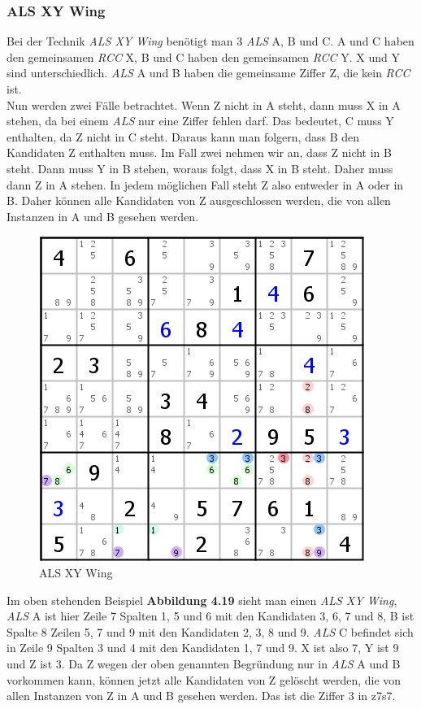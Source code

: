 \newpage
\subsubsection{ALS XY Wing}
Bei der Technik \textit{ALS XY Wing} benötigt man 3 \textit{ALS} A, B und C. A und C haben den gemeinsamen \textit{RCC} X, B und C haben den gemeinsamen \textit{RCC} Y. X und Y sind unterschiedlich. \textit{ALS} A und B haben die gemeinsame Ziffer Z, die kein \textit{RCC} ist.\\
Nun werden zwei Fälle betrachtet. Wenn Z nicht in A steht, dann muss X in A stehen, da bei einem \textit{ALS} nur eine Ziffer fehlen darf. Das bedeutet, C muss Y enthalten, da Z nicht in C steht. Daraus kann man folgern, dass B den Kandidaten Z enthalten muss. Im Fall zwei nehmen wir an, dass Z nicht in B steht. Dann muss Y in B stehen, woraus folgt, dass X in B steht. Daher muss dann Z in A stehen. In jedem möglichen Fall steht Z also entweder in A oder in B. Daher können alle Kandidaten von Z ausgeschlossen werden, die von allen Instanzen in A und B gesehen werden.

\begin{figure}[h]
\begin{center}
\includegraphics{./img/ALS_XY_Wing.png}
\caption{ALS XY Wing}
\end{center}
\end{figure}

Im oben stehenden Beispiel \textbf{Abbildung 4.19} sieht man einen \textit{ALS XY Wing}, \textit{ALS} A ist hier Zeile 7 Spalten 1, 5 und 6 mit den Kandidaten 3, 6, 7 und 8, B ist Spalte 8 Zeilen 5, 7 und 9 mit den Kandidaten 2, 3, 8 und 9. \textit{ALS} C befindet sich in Zeile 9 Spalten 3 und 4 mit den Kandidaten 1, 7 und 9. X ist also 7, Y ist 9 und Z ist 3. Da Z wegen der oben genannten Begründung nur in \textit{ALS} A und B vorkommen kann, können jetzt alle Kandidaten von Z gelöscht werden, die von allen Instanzen von Z in A und B gesehen werden. Das ist die Ziffer 3 in z7s7.